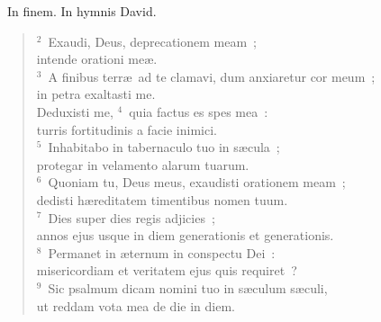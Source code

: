 ~\lettrine[lines=10,image=true,loversize=0.05,lraise=-0.03]{I}{}n finem. In hymnis David.
\begin{flushleft}\begin{verse}\vspace{6pt}${}^{2}$~Exaudi, Deus, deprecationem meam~;\\ intende orationi me\ae .\\
${}^{3}$~A finibus terr\ae\ ad te clamavi, dum anxiaretur cor meum~;\\ in petra exaltasti me.\\ Deduxisti me,
${}^{4}$~quia factus es spes mea~:\\ turris fortitudinis a facie inimici.\\
${}^{5}$~Inhabitabo in tabernaculo tuo in s\ae cula~;\\ protegar in velamento alarum tuarum.\\
${}^{6}$~Quoniam tu, Deus meus, exaudisti orationem meam~;\\ dedisti h\ae reditatem timentibus nomen tuum.\\
${}^{7}$~Dies super dies regis adjicies~;\\ annos ejus usque in diem generationis et generationis.\\
${}^{8}$~Permanet in \ae ternum in conspectu Dei~:\\ misericordiam et veritatem ejus quis requiret~?\\
${}^{9}$~Sic psalmum dicam nomini tuo in s\ae culum s\ae culi,\\ ut reddam vota mea de die in diem.\end{verse}\end{flushleft}


